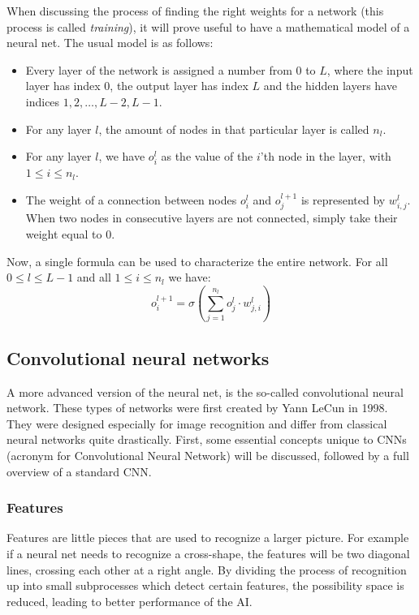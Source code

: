 \documentclass[12pt, titlepage]{article}
\begin{document}
		When discussing the process of finding the right weights for a network (this process is called \textit{training}), it will prove useful to have a mathematical model of a neural net. The usual model is as follows:
		\begin{itemize}
			\item Every layer of the network is assigned a number from $0$ to $L$, where the input layer 			has index $0$, the output layer has index $L$ and the hidden layers have indices $1,2,					\ldots,L-2,L-1$.
			\item For any layer $l$, the amount of nodes in that particular layer is called $n_l$.
			\item For any layer $l$, we have $o^l_i$ as the value of the $i$'th node in the layer, with 			$1\le i\le n_l$.
			\item The weight of a connection between nodes $o^l_i$ and $o^{l+1}_j$ is represented by 				$w^l_{i,j}$. When two nodes in consecutive layers are not connected, simply take their 				weight equal to $0$.
		\end{itemize}
		Now, a single formula can be used to characterize the entire network. For all $0\le l\le L-1$ and all $1\le i\le n_l$ we have:
		\begin{equation*}
		o^{l+1}_i = \sigma\left(\sum_{j=1}^{n_{l}}o^{l}_j\cdot w^{l}_{j,i}\right)
		\end{equation*}
		
		\subsection{Convolutional neural networks}
		A more advanced version of the neural net, is the so-called convolutional neural network. These types of networks were first created by Yann LeCun \cite{lecun} in 1998. They were designed especially 	for image recognition and differ from classical neural networks quite drastically. First, some essential concepts unique to CNNs (acronym for Convolutional Neural Network) will be discussed, followed by a full overview of a standard CNN.
		
		\subsubsection{Features}
		Features are little pieces that are used to recognize a larger picture. For example if a neural net needs to recognize a cross-shape, the features will be two diagonal lines, crossing each other at a right angle. By dividing the process of recognition up into small subprocesses which detect certain features, the possibility space is reduced, leading to better performance of the AI.
		
\end{document}
